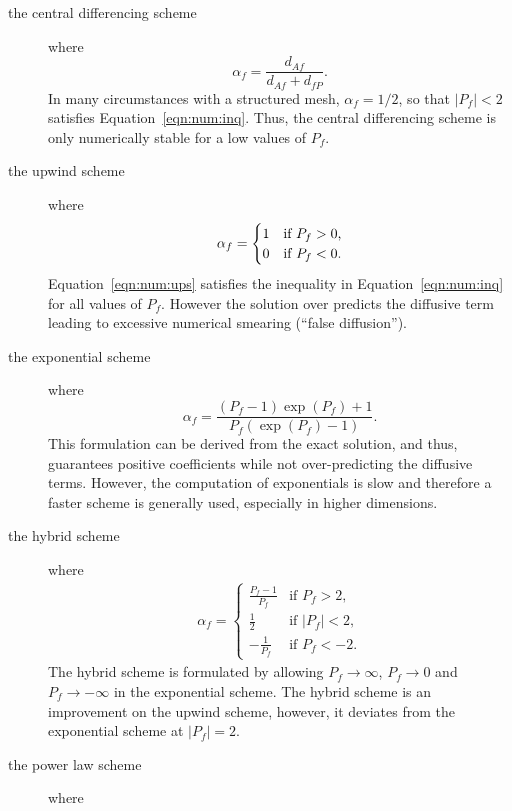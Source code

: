 \begin{description}
%
%
%
\item[the central differencing scheme] where
\begin{equation}
\alpha_f = \frac{d_{Af}}{d_{Af}+d_{fP}}.
\label{eqn:num:cds}
\end{equation}
In many circumstances with a structured mesh, $\alpha_f=1/2$, so that
$|P_f|<2$ satisfies Equation~\eqref{eqn:num:inq}.  Thus, the central
differencing scheme is only numerically stable for a low values of
$P_f$.
%
%
%
\item[the upwind scheme] where
\begin{eqnarray}
\alpha_f = \begin{cases}
1 & \text{if $P_f > 0$,} \\
0 & \text{if $ P_f < 0$.}
\end{cases}
\label{eqn:num:ups}
\end{eqnarray}
Equation~\eqref{eqn:num:ups} satisfies the inequality in
Equation~\eqref{eqn:num:inq} for all values of $P_f$.  However the
solution over predicts the diffusive term leading to excessive
numerical smearing (``false diffusion'').
%
%
%
\item[the exponential scheme] where
\begin{equation}
\alpha_f = \frac{(P_f-1)\exp{(P_f)}+1}{P_f(\exp{(P_f)}-1)}.
\label{eqn:num:exs}
\end{equation}
This formulation can be derived from the exact solution, and thus,
guarantees positive coefficients while not over-predicting the
diffusive terms. However, the computation of exponentials is slow and
therefore a faster scheme is generally used, especially in higher
dimensions.
%
%
%
\item[the hybrid scheme] where
\begin{eqnarray}
\alpha_f = 
\begin{cases}
    \frac{P_f-1}{P_f} & \text{if $P_f > 2$,} \\
    \frac{1}{2} & \text{if $|P_f| < 2$,} \\
    -\frac{1}{P_f} & \text{if $P_f < -2$.}
\end{cases}
\label{eqn:num:hys}
\end{eqnarray}
The hybrid scheme is formulated by allowing $P_f \rightarrow \infty$,
$P_f \rightarrow 0$ and $P_f \rightarrow -\infty$ in the exponential
scheme.  The hybrid scheme is an improvement on the upwind scheme,
however, it deviates from the exponential scheme at $|P_f|=2$.
%
%
%
\item[the power law scheme] where

\end{description}
